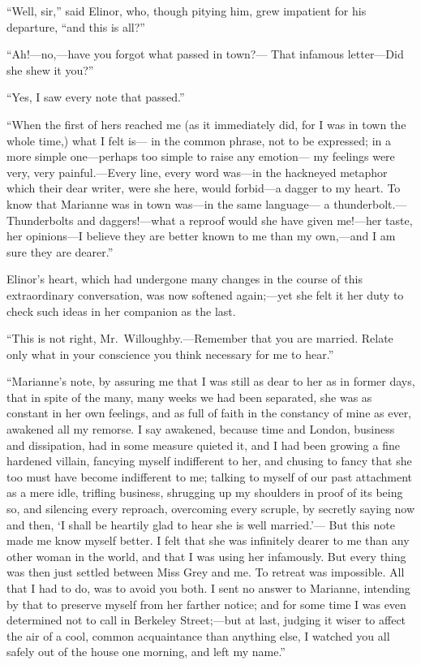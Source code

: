 ``Well, sir,'' said Elinor, who, though pitying him,
grew impatient for his departure, ``and this is all?''

``Ah!---no,---have you forgot what passed in town?---%
That infamous letter---Did she shew it you?''

``Yes, I saw every note that passed.''

``When the first of hers reached me (as it immediately did,
for I was in town the whole time,) what I felt is---%
in the common phrase, not to be expressed; in a more
simple one---perhaps too simple to raise any emotion---%
my feelings were very, very painful.---Every line, every word
was---in the hackneyed metaphor which their dear writer,
were she here, would forbid---a dagger to my heart.
To know that Marianne was in town was---in the same language---%
a thunderbolt.---Thunderbolts and daggers!---what a reproof
would she have given me!---her taste, her opinions---I believe
they are better known to me than my own,---and I am sure
they are dearer.''

Elinor's heart, which had undergone many changes
in the course of this extraordinary conversation,
was now softened again;---yet she felt it her duty to check
such ideas in her companion as the last.

``This is not right, Mr.\ Willoughby.---Remember that
you are married.  Relate only what in your conscience
you think necessary for me to hear.''

``Marianne's note, by assuring me that I was still
as dear to her as in former days, that in spite of the many,
many weeks we had been separated, she was as constant
in her own feelings, and as full of faith in the constancy
of mine as ever, awakened all my remorse.  I say awakened,
because time and London, business and dissipation,
had in some measure quieted it, and I had been growing
a fine hardened villain, fancying myself indifferent to her,
and chusing to fancy that she too must have become
indifferent to me; talking to myself of our past attachment
as a mere idle, trifling business, shrugging up my shoulders
in proof of its being so, and silencing every reproach,
overcoming every scruple, by secretly saying now and then,
`I shall be heartily glad to hear she is well married.'---%
But this note made me know myself better.  I felt that
she was infinitely dearer to me than any other woman
in the world, and that I was using her infamously.
But every thing was then just settled between Miss Grey
and me.  To retreat was impossible.  All that I had to do,
was to avoid you both.  I sent no answer to Marianne,
intending by that to preserve myself from her farther notice;
and for some time I was even determined not to call in
Berkeley Street;---but at last, judging it wiser to affect
the air of a cool, common acquaintance than anything else,
I watched you all safely out of the house one morning,
and left my name.''

